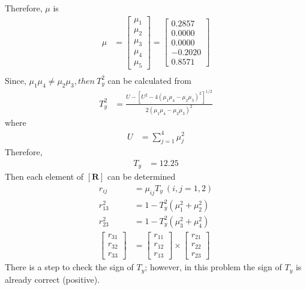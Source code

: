 \documentclass[]{article}
\begin{document}
\indent Therefore, $\mu$ is
\begin{align*}
 \mu &=
 \begin{bmatrix}
 \mu_1\\
 \mu_2\\
 \mu_3\\
 \mu_4\\
 \mu_5
 \end{bmatrix} =
 \begin{bmatrix}
 	0.2857\\
 	0.0000\\
 	0.0000\\
 	-0.2020\\
 	0.8571
 \end{bmatrix}\\
\end{align*}
\indent Since, $\mu_1\mu_4 \neq \mu_2\mu_3, then \ T_y^2$ can be calculated from\\
\begin{align*}
T_y^2 &= \frac{U-[U^2-4(\mu_1\mu_4-\mu_2\mu_3)^2]^{1/2}}{2(\mu_1\mu_4-\mu_2\mu_3)^2}
\end{align*}
\indent where
\begin{align*}
U &= \sum_{j=1}^{4}\mu_j^2
\end{align*}
\indent Therefore,
\begin{align*}
T_y &= 12.25
\end{align*}
\indent Then each element of $[\textbf{R}]$ can be determined
\begin{align*}
r_{ij} &= \mu_{ij}T_y \ (i,j = 1,2)\\
r_{13}^2 &= 1-T_y^2(\mu_1^2+\mu_2^2)\\
r_{23}^2 &= 1-T_y^2(\mu_3^2+\mu_4^2)\\
\begin{bmatrix}
r_{31}\\
r_{32}\\
r_{33}
\end{bmatrix} &=
\begin{bmatrix}
r_{11}\\
r_{12}\\
r_{13}
\end{bmatrix} \times
\begin{bmatrix}
r_{21}\\
r_{22}\\
r_{23}
\end{bmatrix}
\end{align*}
\indent There is a step to check the sign of $T_y$; however, in this problem the sign of $T_y$ is already correct (positive).\\
\end{document}
